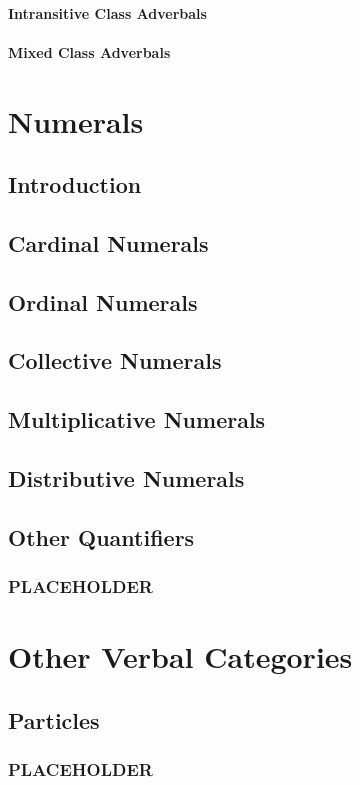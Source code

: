 \documentclass[a4paper, 12pt, oneside]{memoir}
\begin{document}
\subsubsection{Intransitive Class Adverbals}
\subsubsection{Mixed Class Adverbals}
\chapter{Numerals}\label{c:numerals}
\section{Introduction}
\section{Cardinal Numerals}
\section{Ordinal Numerals}
\section{Collective Numerals}
\section{Multiplicative Numerals}
\section{Distributive Numerals}
\section{Other Quantifiers}
\subsection{PLACEHOLDER}
\chapter{Other Verbal Categories}
\section{Particles}
\subsection{PLACEHOLDER}
\end{document}
